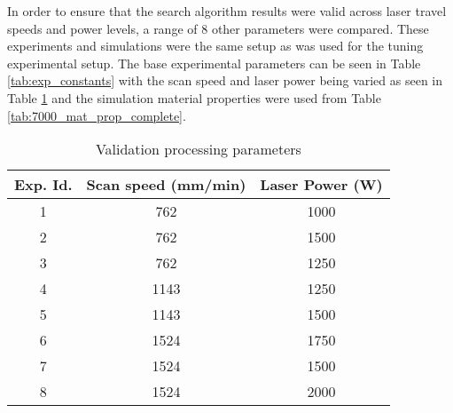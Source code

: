 \label{validation}

In order to ensure that the search algorithm results were valid across laser travel speeds and power levels, a range of 8 other parameters were compared.
These experiments and simulations were the same setup as was used for the tuning experimental setup.  The base experimental parameters can be seen in Table \ref{tab:exp_constants} with the scan speed and laser power being varied as seen in Table \ref{tab:val_parameters} and the simulation material properties were used from Table \ref{tab:7000_mat_prop_complete}.

\begin{table}[!htb]
	\centering
	\caption{Validation processing parameters}
	\label{tab:val_parameters}
		\begin{tabular}{|c|c|c|} \hline 
			Exp. Id. & Scan speed (mm/min) & Laser Power (W) \\ \hline
			1 & 762 & 1000 \\ \hline  %
			2 & 762 & 1500 \\ \hline  %
			3 & 762 & 1250 \\ \hline  %
			4 & 1143 & 1250 \\ \hline %
			5 & 1143 & 1500 \\ \hline  %
			6 & 1524 & 1750 \\ \hline  %
			7 & 1524 & 1500 \\ \hline  %
			8 & 1524 & 2000 \\ \hline  %
		\end{tabular}
\end{table}

